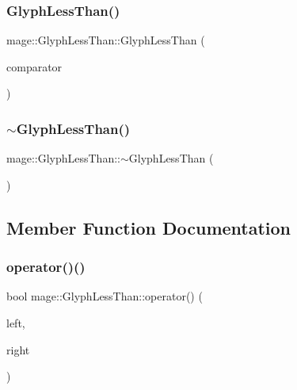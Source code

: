 \subsubsection{\texorpdfstring{Glyph\+Less\+Than()}{GlyphLessThan()}\hspace{0.1cm}{\footnotesize\ttfamily [3/3]}}
{\footnotesize\ttfamily mage\+::\+Glyph\+Less\+Than\+::\+Glyph\+Less\+Than (\begin{DoxyParamCaption}\item[{\hyperlink{structmage_1_1_glyph_less_than}{Glyph\+Less\+Than} \&\&}]{comparator }\end{DoxyParamCaption})\hspace{0.3cm}{\ttfamily [default]}}

\hypertarget{structmage_1_1_glyph_less_than_ace50804a419a31b0413566b5aba2eeac}{}\label{structmage_1_1_glyph_less_than_ace50804a419a31b0413566b5aba2eeac} 
\subsubsection{\texorpdfstring{$\sim$\+Glyph\+Less\+Than()}{~GlyphLessThan()}}
{\footnotesize\ttfamily mage\+::\+Glyph\+Less\+Than\+::$\sim$\+Glyph\+Less\+Than (\begin{DoxyParamCaption}{ }\end{DoxyParamCaption})\hspace{0.3cm}{\ttfamily [default]}}



\subsection{Member Function Documentation}
\hypertarget{structmage_1_1_glyph_less_than_a5ba9326b1293585e6257cf1d5697a1ba}{}\label{structmage_1_1_glyph_less_than_a5ba9326b1293585e6257cf1d5697a1ba} 
\subsubsection{\texorpdfstring{operator()()}{operator()()}\hspace{0.1cm}{\footnotesize\ttfamily [1/3]}}
{\footnotesize\ttfamily bool mage\+::\+Glyph\+Less\+Than\+::operator() (\begin{DoxyParamCaption}\item[{const \hyperlink{structmage_1_1_glyph}{Glyph} \&}]{left,  }\item[{const \hyperlink{structmage_1_1_glyph}{Glyph} \&}]{right }\end{DoxyParamCaption})}

